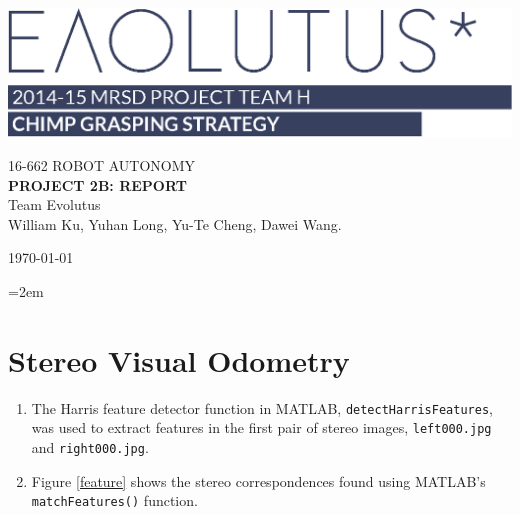 \documentclass[letter, 10pt]{article}
\begin{document}
\begin{onehalfspacing}

\begin{titlepage}

	\noindent\includegraphics[scale = 0.4]{evolutus-with-text-blue.eps}
	\vspace{25\baselineskip}\vfill
	
	{\noindent\Large\uppercase{16-662 Robot Autonomy}\\[6pt]
	\Huge\uppercase{\bf Project 2B: Report}}\\[6pt]
	
	\noindent Team Evolutus \\
	\noindent William Ku, Yuhan Long, Yu-Te Cheng, Dawei Wang. \vspace{12pt}
	
	\noindent\today\vfill

\end{titlepage}

\pagestyle{fancy}

\setlength{\parskip}{0.5\baselineskip}
\RaggedRight
\parindent=2em

\newpage

\section{Stereo Visual Odometry}
\begin{enumerate}[leftmargin=2em,label={\alph*)}]
\item %
The Harris feature detector function in MATLAB, {\tt detectHarrisFeatures}, was used to extract features in the first pair of stereo images, {\tt left000.jpg} and {\tt right000.jpg}.
\item %
Figure \ref{feature} shows the stereo correspondences found using MATLAB's {\tt matchFeatures()} function.

\begin{figure}[b!]
	\centering


\end{figure}
\end{enumerate}
\end{onehalfspacing}
\end{document}
